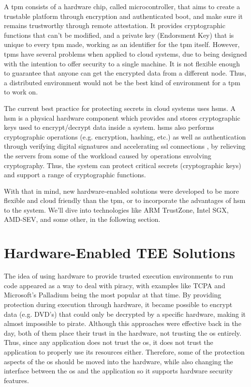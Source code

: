 A \gls{tpm} \cite{tpmPaper} consists of a hardware chip, called microcontroller, that aims to create a trustable platform through encryption and authenticated boot, and make sure it remains trustworthy through remote attestation. 
It provides cryptographic functions that can't be modified, and a private key (Endorsment Key) that is unique to every \gls{tpm} made, working as an identifier for the \gls{tpm} itself.
However, \gls{tpm}s have several problems when applied to cloud systems, due to being designed with the intention to offer security to a single machine. It is not flexible enough to guarantee that anyone can get the encrypted data from a different node.
Thus, a distributed environment would not be the best kind of environment for a \gls{tpm} to work on.

The current best practice for protecting secrets in  cloud systems uses \gls{hsm}s. 
A \gls{hsm} \cite{hsmPaper} is a physical hardware component which provides and stores cryptographic keys used to encrypt/decrypt data inside a system. \gls{hsm}s also performs cryptographic operations (e.g. encryption, hashing, etc.) as well as authentication through verifying digital signatures and accelerating \gls{ssl} connections \cite{hsmThesis}, by relieving the servers from some of the workload caused by operations envolving cryptography. 
Thus, the system can protect critical secrets (cryptographic keys) and support a range of cryptographic functions.

With that in mind, new hardware-enabled solutions were developed to be more flexible and cloud friendly than the \gls{tpm}, or to incorporate the advantages of \gls{hsm} to the system. We'll dive into technologies like ARM TrustZone, Intel SGX, AMD-SEV, and some other, in the following section.




\section{Hardware-Enabled TEE Solutions}
\label{sec:hardwareTEEs}

The idea of using hardware to provide trusted execution environments to run code appeared as a way to deal with piracy, with examples like TCPA \cite{tcpaPaper} and Microsoft's Palladium \cite{microsoftPalladium} being the most popular at that time. By providing protection during execution through hardware, it became possible to encrypt data (e.g. DVD's) that could only be decrypted by a specific hardware, making it almost impossible to pirate. 
Although this approaches were effective back in the day, both of them place their trust in the hardware, not trusting the \gls{os} entirely. 
Thus, since any application does not trust the \gls{os}, it does not trust the application to properly use its resources either. Therefore, some of the protection aspects of the \gls{os} should be moved into the hardware, while also changing the interface between the \gls{os} and the application so it supports hardware security features. 

